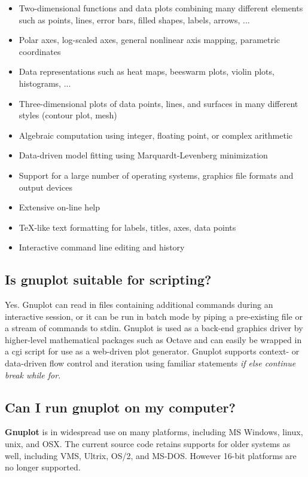 \documentclass[letter,11pt]{article}
\newcommand{\gnuplot}{\textbf{gnuplot }}
\newcommand{\Gnuplot}{\textbf{Gnuplot }}
\begin{document}
{\begin{itemize}
\item Two-dimensional functions and data plots combining many different
 elements such as points, lines, error bars, filled shapes, labels, arrows, ...
\item Polar axes, log-scaled axes, general nonlinear axis mapping, parametric coordinates
\item Data representations such as heat maps, beeswarm plots, violin plots, histograms, ...
\item Three-dimensional plots of data points, lines, and surfaces in
many different styles (contour plot, mesh)
\item Algebraic computation using integer, floating point, or complex arithmetic
\item Data-driven model fitting using Marquardt-Levenberg minimization
\item Support for a large number of operating systems, graphics
 file formats and output devices
\item Extensive on-line help
\item \TeX{}-like text formatting for labels, titles, axes, data points
\item Interactive command line editing and history
\end{itemize}


\subsection{Is \gnuplot suitable for scripting?}

Yes. Gnuplot can read in files containing additional commands during
an interactive session, or it can be run in batch mode by piping a
pre-existing file or a stream of commands to stdin. Gnuplot is used
as a back-end graphics driver by higher-level mathematical packages
such as Octave and can easily be wrapped in a cgi script for use as a
web-driven plot generator.  Gnuplot supports context- or data-driven
flow control and iteration using familiar statements
{\em if else continue break while for}.


\subsection{Can I run \gnuplot on my computer?}

\Gnuplot{} is in widespread use on many platforms, including
MS Windows, linux, unix, and OSX.  The current source code retains
supports for older systems as well, including VMS, Ultrix, OS/2, and
MS-DOS. However 16-bit platforms are no longer supported.

}
\end{document}
